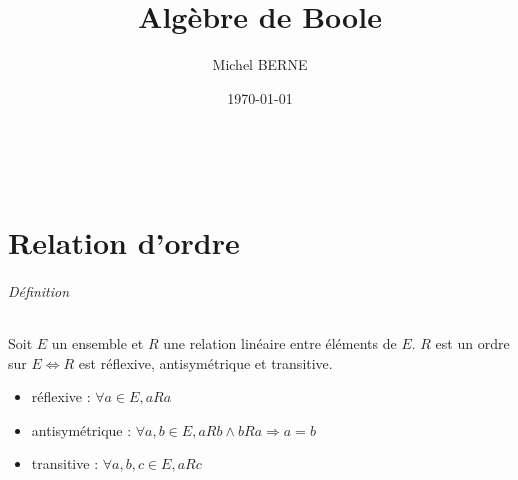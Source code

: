 \documentclass[11pt]{article}
\begin{document}
    \title{Algèbre de Boole}
    \author{Michel BERNE}
    \date{\today}

\maketitle
\setcounter{page}{0} \thispagestyle{empty} %
\newpage
\setcounter{page}{2} %
~\\
\newpage

\renewcommand{\contentsname}{Sommaire}
\tableofcontents

\newpage
\part{Relation d'ordre}
    \paragraph{Définition}
        Soit $E$ un ensemble et $R$ une relation linéaire entre éléments de $E$. $R$ est un ordre sur $E \Leftrightarrow R$ est réflexive, antisymétrique et transitive.
        \begin{itemize}
            \item réflexive : $\forall a\in E,aRa$
            \item antisymétrique : $\forall a,b\in E,aRb\land bRa\Rightarrow a=b$
            \item transitive : $\forall a,b,c\in E,aRc$
        \end{itemize}
\end{document}

